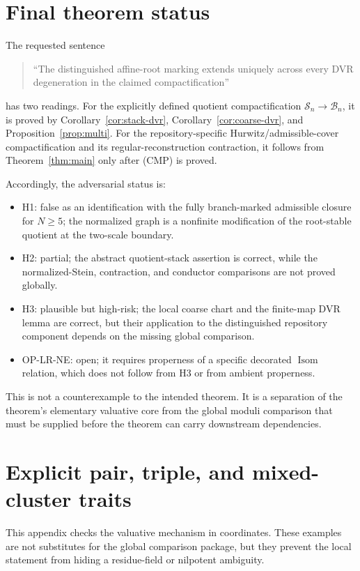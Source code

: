 \documentclass[11pt]{article}
\newcommand{\Isom}{\operatorname{Isom}}
\begin{document}
\section{Final theorem status}

The requested sentence
\begin{quote}
``The distinguished affine-root marking extends uniquely across every DVR
degeneration in the claimed compactification''
\end{quote}
has two readings.  For the explicitly defined quotient compactification
$\mathscr S_n\to\mathscr B_n$, it is proved by
Corollary~\ref{cor:stack-dvr}, Corollary~\ref{cor:coarse-dvr}, and
Proposition~\ref{prop:multi}.  For the repository-specific
Hurwitz/admissible-cover compactification and its regular-reconstruction
contraction, it follows from Theorem~\ref{thm:main} only after (CMP) is
proved.

Accordingly, the adversarial status is:
\begin{itemize}
\item H1: false as an identification with the fully branch-marked admissible
closure for $N\ge5$; the normalized graph is a nonfinite modification of the
root-stable quotient at the two-scale boundary.
\item H2: partial; the abstract quotient-stack assertion is correct, while
the normalized-Stein, contraction, and conductor comparisons are not proved
globally.
\item H3: plausible but high-risk; the local coarse chart and the finite-map
DVR lemma are correct, but their application to the distinguished repository
component depends on the missing global comparison.
\item OP-LR-NE: open; it requires properness of a specific decorated
$\Isom$ relation, which does not follow from H3 or from ambient properness.
\end{itemize}

This is not a counterexample to the intended theorem.  It is a separation of
the theorem's elementary valuative core from the global moduli comparison
that must be supplied before the theorem can carry downstream dependencies.

\appendix
\section{Explicit pair, triple, and mixed-cluster traits}

This appendix checks the valuative mechanism in coordinates.  These examples
are not substitutes for the global comparison package, but they prevent the
local statement from hiding a residue-field or nilpotent ambiguity.
\end{document}
